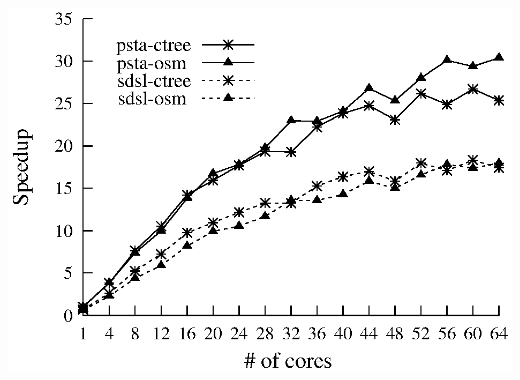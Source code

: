{\begin{minipage}{\textwidth}
    \begin{minipage}[b]{0.51\textwidth}
      \includegraphics[scale=0.5]{./images/speedup}
      \label{fig:speedup}
    \end{minipage}
  \end{minipage}
      }
%
